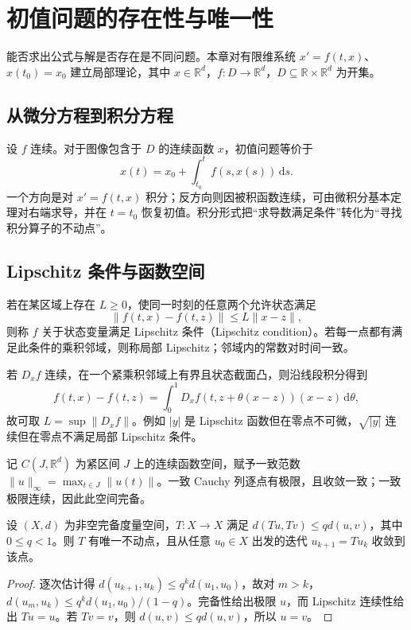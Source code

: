\setcounter{chapter}{3} %
\chapter{初值问题的存在性与唯一性}
\label{chap:ode-existence}

能否求出公式与解是否存在是不同问题。本章对有限维系统 $x'=f(t,x)$、$x(t_0)=x_0$ 建立局部理论，其中 $x\in\mathbb R^d$，$f:D\to\mathbb R^d$，$D\subseteq\mathbb R\times\mathbb R^d$ 为开集。

\section{从微分方程到积分方程}
设 $f$ 连续。对于图像包含于 $D$ 的连续函数 $x$，初值问题等价于
\begin{equation}
 x(t)=x_0+\int_{t_0}^t f(s,x(s))\,\mathrm ds.
 \label{eq:ode-integral-ivp}
\end{equation}
一个方向是对 $x'=f(t,x)$ 积分；反方向则因被积函数连续，可由微积分基本定理对右端求导，并在 $t=t_0$ 恢复初值。积分形式把“求导数满足条件”转化为“寻找积分算子的不动点”。

\section{Lipschitz 条件与函数空间}
\begin{definition}
若在某区域上存在 $L\geq0$，使同一时刻的任意两个允许状态满足
\[
 \|f(t,x)-f(t,z)\|\leq L\|x-z\|,
\]
则称 $f$ 关于状态变量满足 Lipschitz 条件（Lipschitz condition）。若每一点都有满足此条件的乘积邻域，则称局部 Lipschitz；邻域内的常数对时间一致。
\end{definition}

若 $D_xf$ 连续，在一个紧乘积邻域上有界且状态截面凸，则沿线段积分得到
\[
 f(t,x)-f(t,z)=\int_0^1D_xf(t,z+\theta(x-z))(x-z)\,\mathrm d\theta,
\]
故可取 $L=\sup\|D_xf\|$。例如 $|y|$ 是 Lipschitz 函数但在零点不可微，$\sqrt{|y|}$ 连续但在零点不满足局部 Lipschitz 条件。

记 $C(J,\mathbb R^d)$ 为紧区间 $J$ 上的连续函数空间，赋予一致范数 $\|u\|_\infty=\max_{t\in J}\|u(t)\|$。一致 Cauchy 列逐点有极限，且收敛一致；一致极限连续，因此此空间完备。

\begin{theorem}[压缩映射原理]
设 $(X,d)$ 为非空完备度量空间，$T:X\to X$ 满足 $d(Tu,Tv)\leq qd(u,v)$，其中 $0\leq q<1$。则 $T$ 有唯一不动点，且从任意 $u_0\in X$ 出发的迭代 $u_{k+1}=Tu_k$ 收敛到该点。
\end{theorem}
\begin{proof}
逐次估计得 $d(u_{k+1},u_k)\leq q^kd(u_1,u_0)$，故对 $m>k$，$d(u_m,u_k)\leq q^kd(u_1,u_0)/(1-q)$。完备性给出极限 $u$，而 Lipschitz 连续性给出 $Tu=u$。若 $Tv=v$，则 $d(u,v)\leq qd(u,v)$，所以 $u=v$。
\end{proof}


